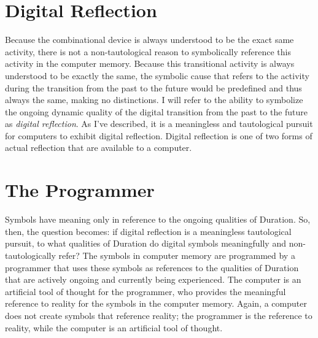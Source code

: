 \section{Digital Reflection}
\label{section:digital_reflection}

Because the combinational device is always understood to be the exact
same activity, there is not a non-tautological reason to symbolically
reference this activity in the computer memory.  Because this
transitional activity is always understood to be exactly the same, the
symbolic cause that refers to the activity during the transition from
the past to the future would be predefined and thus always the same,
making no distinctions.  I will refer to the ability to symbolize the
ongoing dynamic quality of the digital transition from the past to the
future as \emph{digital reflection}.  As I've described, it is a
meaningless and tautological pursuit for computers to exhibit digital
reflection.  Digital reflection is one of two forms of actual
reflection that are available to a computer.

\section{The Programmer}

Symbols have meaning only in reference to the ongoing qualities of
Duration.  So, then, the question becomes: if digital reflection is a
meaningless tautological pursuit, to what qualities of Duration do
digital symbols meaningfully and non-tautologically refer?  The
symbols in computer memory are programmed by a programmer that uses
these symbols as references to the qualities of Duration that are
actively ongoing and currently being experienced.  The computer is an
artificial tool of thought for the programmer, who provides the
meaningful reference to reality for the symbols in the computer
memory.  Again, a computer does not create symbols that reference
reality; the programmer is the reference to reality, while the
computer is an artificial tool of thought.
